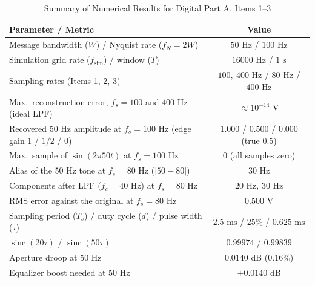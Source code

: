\documentclass[a4paper]{article}
\begin{document}
\begin{table}[H]
\centering
\caption{Summary of Numerical Results for Digital Part A, Items 1--3}
\label{tab:digA_item1_3_summary}
\begin{tabular}{l c}
\toprule
\textbf{Parameter / Metric} & \textbf{Value} \\
\midrule
Message bandwidth ($W$) / Nyquist rate ($f_N = 2W$) & $50\text{ Hz}$ / $100\text{ Hz}$ \\
Simulation grid rate ($f_{\text{sim}}$) / window ($T$) & $16000\text{ Hz}$ / $1\text{ s}$ \\
Sampling rates (Items 1, 2, 3) & $100,\ 400\text{ Hz}$ / $80\text{ Hz}$ / $400\text{ Hz}$ \\
Max.\ reconstruction error, $f_s = 100$ and $400\text{ Hz}$ (ideal LPF) & $\approx 10^{-14}\text{ V}$ \\
Recovered 50 Hz amplitude at $f_s = 100\text{ Hz}$ (edge gain $1$ / $1/2$ / $0$) & $1.000$ / $0.500$ / $0.000$ (true $0.5$) \\
Max.\ sample of $\sin(2\pi 50t)$ at $f_s = 100\text{ Hz}$ & $0$ (all samples zero) \\
Alias of the 50 Hz tone at $f_s = 80\text{ Hz}$ ($|50-80|$) & $30\text{ Hz}$ \\
Components after LPF ($f_c = 40\text{ Hz}$) at $f_s = 80\text{ Hz}$ & $20\text{ Hz}$, $30\text{ Hz}$ \\
RMS error against the original at $f_s = 80\text{ Hz}$ & $0.500\text{ V}$ \\
Sampling period ($T_s$) / duty cycle ($d$) / pulse width ($\tau$) & $2.5\text{ ms}$ / $25\%$ / $0.625\text{ ms}$ \\
$\operatorname{sinc}(20\tau)$ / $\operatorname{sinc}(50\tau)$ & $0.99974$ / $0.99839$ \\
Aperture droop at $50\text{ Hz}$ & $0.0140\text{ dB}$ ($0.16\%$) \\
Equalizer boost needed at $50\text{ Hz}$ & $+0.0140\text{ dB}$ \\
\bottomrule
\end{tabular}
\end{table}
\end{document}
